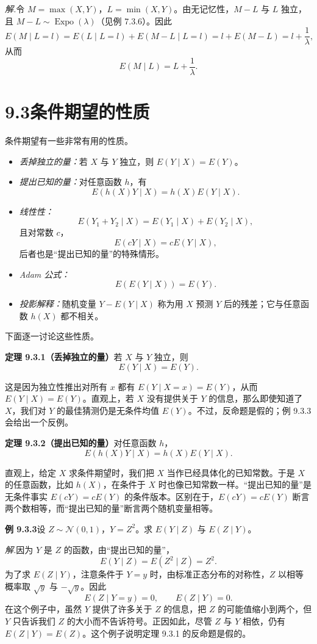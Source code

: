 \documentclass[UTF8, 12pt, fontset=fandol, oneside]{ctexart}
\begin{document}
\noindent\textit{解.}\quad 令 $M=\max(X,Y)$，$L=\min(X,Y)$。由无记忆性，$M-L$ 与 $L$ 独立，且 $M-L\sim\operatorname{Expo}(\lambda)$（见例 7.3.6）。因此
\[
  E(M\mid L=l)=E(L\mid L=l)+E(M-L\mid L=l)
  =l+E(M-L)=l+\frac1\lambda,
\]
从而
\[
  E(M\mid L)=L+\frac1\lambda.
\]

\section*{9.3\quad 条件期望的性质}

条件期望有一些非常有用的性质。

\begin{itemize}
  \item \textit{丢掉独立的量：}若 $X$ 与 $Y$ 独立，则 $E(Y\mid X)=E(Y)$。
  \item \textit{提出已知的量：}对任意函数 $h$，有
  \[
    E(h(X)Y\mid X)=h(X)E(Y\mid X).
  \]
  \item \textit{线性性：}
  \[
    E(Y_1+Y_2\mid X)=E(Y_1\mid X)+E(Y_2\mid X),
  \]
  且对常数 $c$，
  \[
    E(cY\mid X)=cE(Y\mid X),
  \]
  后者也是“提出已知的量”的特殊情形。
  \item \textit{Adam 公式：}
  \[
    E(E(Y\mid X))=E(Y).
  \]
  \item \textit{投影解释：}随机变量 $Y-E(Y\mid X)$ 称为用 $X$ 预测 $Y$ 后的残差；它与任意函数 $h(X)$ 都不相关。
\end{itemize}

下面逐一讨论这些性质。

\noindent\textbf{定理 9.3.1（丢掉独立的量）}\quad 若 $X$ 与 $Y$ 独立，则
\[
  E(Y\mid X)=E(Y).
\]

这是因为独立性推出对所有 $x$ 都有 $E(Y\mid X=x)=E(Y)$，从而 $E(Y\mid X)=E(Y)$。直观上，若 $X$ 没有提供关于 $Y$ 的信息，那么即使知道了 $X$，我们对 $Y$ 的最佳猜测仍是无条件均值 $E(Y)$。不过，反命题是假的；例 9.3.3 会给出一个反例。

\noindent\textbf{定理 9.3.2（提出已知的量）}\quad 对任意函数 $h$，
\[
  E(h(X)Y\mid X)=h(X)E(Y\mid X).
\]

直观上，给定 $X$ 求条件期望时，我们把 $X$ 当作已经具体化的已知常数。于是 $X$ 的任意函数，比如 $h(X)$，在条件于 $X$ 时也像已知常数一样。“提出已知的量”是无条件事实 $E(cY)=cE(Y)$ 的条件版本。区别在于，$E(cY)=cE(Y)$ 断言两个数相等，而“提出已知的量”断言两个随机变量相等。

\noindent\textbf{例 9.3.3}\quad 设 $Z\sim\mathcal N(0,1)$，$Y=Z^2$。求 $E(Y\mid Z)$ 与 $E(Z\mid Y)$。

\noindent\textit{解.}\quad 因为 $Y$ 是 $Z$ 的函数，由“提出已知的量”，
\[
  E(Y\mid Z)=E(Z^2\mid Z)=Z^2.
\]
为了求 $E(Z\mid Y)$，注意条件于 $Y=y$ 时，由标准正态分布的对称性，$Z$ 以相等概率取 $\sqrt y$ 与 $-\sqrt y$。因此
\[
  E(Z\mid Y=y)=0,\qquad E(Z\mid Y)=0.
\]
在这个例子中，虽然 $Y$ 提供了许多关于 $Z$ 的信息，把 $Z$ 的可能值缩小到两个，但 $Y$ 只告诉我们 $Z$ 的大小而不告诉符号。正因如此，尽管 $Z$ 与 $Y$ 相依，仍有 $E(Z\mid Y)=E(Z)$。这个例子说明定理 9.3.1 的反命题是假的。
\end{document}
